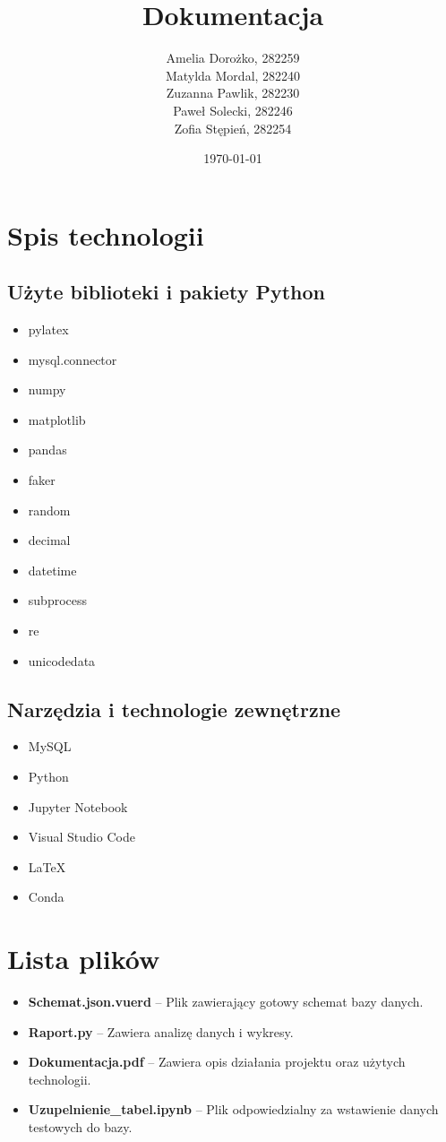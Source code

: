 \documentclass{article}
\title{Dokumentacja}
\author{Amelia Dorożko, 282259 \\
	Matylda Mordal, 282240 \\ 
	Zuzanna Pawlik, 282230 \\ 
	Paweł Solecki, 282246 \\ 
	Zofia Stępień, 282254}
\date{\today}
\theoremstyle{definition}
\begin{document}
	
	\maketitle
	
	\section{Spis technologii}
	
	\subsection{Użyte biblioteki i pakiety Python}
	\begin{itemize}
		\item pylatex
		\item mysql.connector
		\item numpy
		\item matplotlib
		\item pandas
		\item faker
		\item random
		\item decimal
		\item datetime
		\item subprocess
		\item re
		\item unicodedata
	\end{itemize}
	
	\subsection{Narzędzia i technologie zewnętrzne}
	\begin{itemize}
		\item MySQL
		\item Python
		\item Jupyter Notebook
		\item Visual Studio Code
		\item LaTeX
		\item Conda
	\end{itemize}
	
	\section{Lista plików}
	\begin{itemize}
		\item \textbf{Schemat.json.vuerd} -- Plik zawierający gotowy schemat bazy danych.
		\item \textbf{Raport.py} -- Zawiera analizę danych i wykresy.
		\item \textbf{Dokumentacja.pdf} -- Zawiera opis działania projektu oraz użytych technologii.
		\item \textbf{Uzupelnienie\_tabel.ipynb} -- Plik odpowiedzialny za wstawienie danych testowych do bazy.
	\end{itemize}
	
\end{document}
